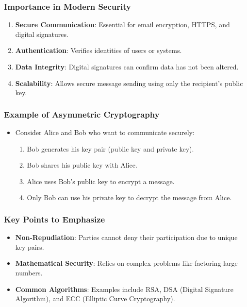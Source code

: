 \documentclass{beamer}
\begin{document}
\begin{frame}[fragile]
    \frametitle{Importance in Modern Security}
    \begin{enumerate}
        \item \textbf{Secure Communication}:
            Essential for email encryption, HTTPS, and digital signatures.
        
        \item \textbf{Authentication}:
            Verifies identities of users or systems.
        
        \item \textbf{Data Integrity}:
            Digital signatures can confirm data has not been altered.
        
        \item \textbf{Scalability}:
            Allows secure message sending using only the recipient's public key.
    \end{enumerate}
\end{frame}

\begin{frame}[fragile]
    \frametitle{Example of Asymmetric Cryptography}
    \begin{itemize}
        \item Consider Alice and Bob who want to communicate securely:
        \begin{enumerate}
            \item Bob generates his key pair (public key and private key).
            \item Bob shares his public key with Alice.
            \item Alice uses Bob's public key to encrypt a message.
            \item Only Bob can use his private key to decrypt the message from Alice.
        \end{enumerate}
    \end{itemize}
\end{frame}

\begin{frame}[fragile]
    \frametitle{Key Points to Emphasize}
    \begin{itemize}
        \item \textbf{Non-Repudiation}: Parties cannot deny their participation due to unique key pairs.
        
        \item \textbf{Mathematical Security}: Relies on complex problems like factoring large numbers.
        
        \item \textbf{Common Algorithms}: Examples include RSA, DSA (Digital Signature Algorithm), and ECC (Elliptic Curve Cryptography).
    \end{itemize}
\end{frame}
\end{document}
